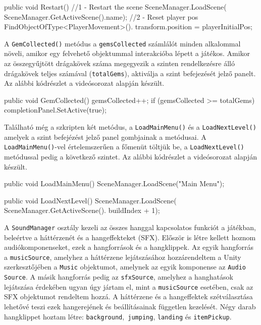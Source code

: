 \begin{java}
public void Restart()
{
    //1 - Restart the scene
    SceneManager.LoadScene(
        SceneManager.GetActiveScene().name);
    //2 - Reset player pos
    FindObjectOfType<PlayerMovement>().
        transform.position = playerInitialPos;
}
\end{java}

A \texttt{GemCollected()} metódus a \texttt{gemsCollected} számlálót minden alkalommal növeli, amikor egy felvehető objektummal interakcióba lépett a játékos. Amikor az összegyűjtött drágakövek száma megegyezik a szinten rendelkezésre álló drágakövek teljes számával (\texttt{totalGems}), aktiválja a szint befejezését jelző panelt. Az alábbi kódrészlet a \cite{youtubeplaylist} videósorozat alapján készült.

\begin{java}
public void GemCollected()
{
    gemsCollected++;
    if (gemsCollected >= totalGems)
    {
        completionPanel.SetActive(true);   
    }
}
\end{java}

Található még a szkripten két metódus, a \texttt{LoadMainMenu()} és a \texttt{LoadNextLevel()} amelyek a szint befejézést jelző panel gombjainak a metódusai. A \texttt{LoadMainMenu()}-vel értelemszerűen a főmenüt töltjük be, a \texttt{LoadNextLevel()} metódussal pedig a következő szintet. Az alábbi kódrészlet a \cite{youtubeplaylist} videósorozat alapján készült.

\begin{java}
public void LoadMainMenu()
{
    SceneManager.LoadScene("Main Menu");
}

public void LoadNextLevel()
{
    SceneManager.LoadScene(
        SceneManager.GetActiveScene().
        buildIndex + 1);
}
\end{java}

A \texttt{SoundManager} osztály kezeli az összes hanggal kapcsolatos funkciót a játékban, beleértve a háttérzenét és a hangeffekteket (SFX). Először is létre kellett hoznom audiókomponenseket, ezek a hangforrások és a hangklippek. Az egyik hangforrás a \texttt{musicSource}, amelyhez a háttérzene lejátszásához hozzárendeltem a Unity szerkesztőjében a \texttt{Music} objektumot, amelynek az egyik komponense az \texttt{Audio Source}. A másik hangforrás pedig az \texttt{sfxSource}, amelyhez a hanghatások lejátszása érdekében ugyan úgy jártam el, mint a \texttt{musicSource} esetében, csak az SFX objektumot rendeltem hozzá. A háttérzene és a hangeffektek szétválasztása lehetővé teszi ezek hangerejének és beállításainak független kezelését. Négy darab hangklippet hoztam létre: \texttt{background},\texttt{ jumping}, \texttt{landing} és \texttt{itemPickup}.

